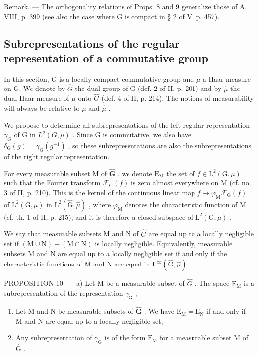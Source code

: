 Remark. --- The orthogonality relations of Props. 8 and 9 generalize those of A, VIII, p. 399 (see also the case where G is compact in § 2 of V, p. 457).

\subsection{Subrepresentations of the regular representation of a commutative group}

In this section, G is a locally compact commutative group and \(\mu\) a Haar measure on G. We denote by \(\hat{G}\) the dual group of G (def. 2 of II, p. 201) and by \(\hat{\mu}\) the dual Haar measure of \(\mu\) onto \(\hat{G}\) (def. 4 of II, p. 214). The notions of measurability will always be relative to \(\mu\) and \(\hat{\mu}\) .

We propose to determine all subrepresentations of the left regular representation \(\gamma_{G}\) of G in \(L^{2}(G,\mu)\) . Since G is commutative, we also have \(\delta_{\mathrm{G}}(g)=\gamma_{\mathrm{G}}(g^{-1})\) , so these subrepresentations are also the subrepresentations of the right regular representation.

For every measurable subset M of \(\widehat{\mathbf{G}}\) , we denote \(\mathrm{E_M}\) the set of \(f \in \mathrm{L}^2 (\mathrm{G},\mu)\) such that the Fourier transform \(\mathcal{F}_{\mathrm{G}}(f)\) is zero almost everywhere on M (cf. no. 3 of II, p. 210). This is the kernel of the continuous linear map \(f \mapsto \varphi_{\mathrm{M}}\mathcal{F}_{\mathrm{G}}(f)\) of \(\mathrm{L}^2 (\mathrm{G},\mu)\) in \(\mathrm{L}^2 (\widehat{\mathrm{G}},\widehat{\mu})\) , where \(\varphi_{\mathrm{M}}\) denotes the characteristic function of M (cf. th. 1 of II, p. 215), and it is therefore a closed subspace of \(\mathrm{L}^2 (\mathrm{G},\mu)\) .

We say that measurable subsets M and N of \(\widehat{G}\) are equal up to a locally negligible set if \((\mathrm{M} \cup \mathrm{N}) - (\mathrm{M} \cap \mathrm{N})\) is locally negligible. Equivalently, measurable subsets M and N are equal up to a locally negligible set if and only if the characteristic functions of M and N are equal in \(\mathrm{L}^{\infty}(\widehat{\mathrm{G}}, \widehat{\mu})\) .

PROPOSITION 10. --- a) Let M be a measurable subset of \(\widehat{G}\) . The space \(\mathrm{E}_{\mathrm{M}}\) is a subrepresentation of the representation \(\gamma_{\mathrm{G}}\) ;

\begin{enumerate}
\def\labelenumi{\alph{enumi})}
\setcounter{enumi}{1}
\item
  Let M and N be measurable subsets of \(\widehat{\mathbf{G}}\) . We have \(\mathrm{E_M} = \mathrm{E_N}\) if and only if M and N are equal up to a locally negligible set;
\item
  Any subrepresentation of \(\gamma_{\mathrm{G}}\) is of the form \(\mathrm{E}_{\mathrm{M}}\) for a measurable subset M of \(\widehat{\mathrm{G}}\) .
\end{enumerate}

